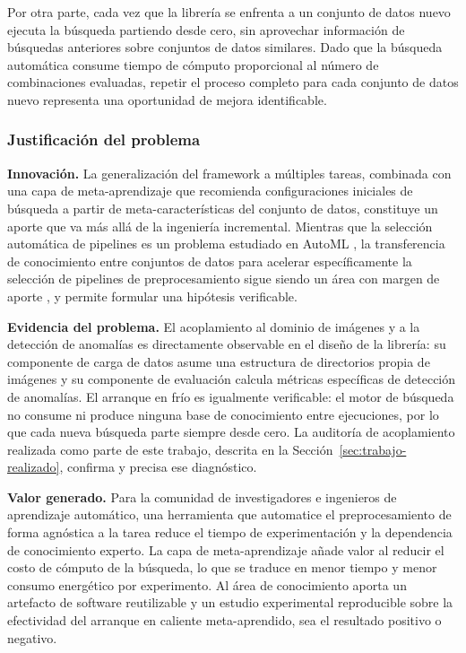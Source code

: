\documentclass[12pt,letterpaper,oneside]{article}
\begin{document}
Por otra parte, cada vez que la librería se enfrenta a un conjunto de datos nuevo
ejecuta la búsqueda partiendo desde cero, sin aprovechar información de búsquedas
anteriores sobre conjuntos de datos similares. Dado que la búsqueda automática consume
tiempo de cómputo proporcional al número de combinaciones evaluadas, repetir el proceso
completo para cada conjunto de datos nuevo representa una oportunidad de mejora
identificable.

\subsubsection{Justificación del problema}

\textbf{Innovación.} La generalización del framework a múltiples tareas, combinada con
una capa de meta-aprendizaje que recomienda configuraciones iniciales de búsqueda a
partir de meta-características del conjunto de datos, constituye un aporte que va más
allá de la ingeniería incremental. Mientras que la selección automática de pipelines es
un problema estudiado en AutoML \cite{hutter2019automl}, la transferencia de conocimiento
entre conjuntos de datos para acelerar específicamente la selección de pipelines de
preprocesamiento sigue siendo un área con margen de aporte
\cite{brazdil2009metalearning}, y permite formular una hipótesis verificable.

\textbf{Evidencia del problema.} El acoplamiento al dominio de imágenes y a la detección
de anomalías es directamente observable en el diseño de la librería: su componente de
carga de datos asume una estructura de directorios propia de imágenes y su componente de
evaluación calcula métricas específicas de detección de anomalías. El arranque en frío es
igualmente verificable: el motor de búsqueda no consume ni produce ninguna base de
conocimiento entre ejecuciones, por lo que cada nueva búsqueda parte siempre desde cero.
La auditoría de acoplamiento realizada como parte de este trabajo, descrita en la
Sección~\ref{sec:trabajo-realizado}, confirma y precisa ese diagnóstico.

\textbf{Valor generado.} Para la comunidad de investigadores e ingenieros de aprendizaje
automático, una herramienta que automatice el preprocesamiento de forma agnóstica a la
tarea reduce el tiempo de experimentación y la dependencia de conocimiento experto. La
capa de meta-aprendizaje añade valor al reducir el costo de cómputo de la búsqueda, lo
que se traduce en menor tiempo y menor consumo energético por experimento. Al área de
conocimiento aporta un artefacto de software reutilizable y un estudio experimental
reproducible sobre la efectividad del arranque en caliente meta-aprendido, sea el
resultado positivo o negativo.
\end{document}
